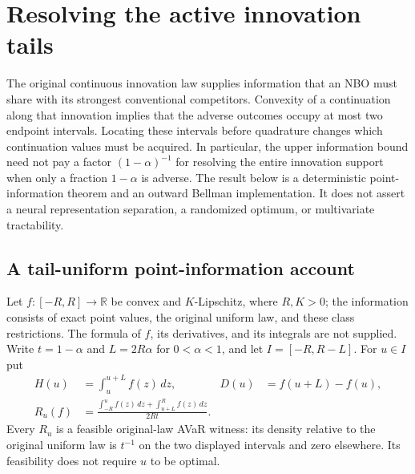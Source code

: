 \section{Resolving the active innovation tails}\label{sec:activetail119}
The original continuous innovation law supplies information that an NBO
must share with its strongest conventional competitors.  Convexity of a
continuation along that innovation implies that the adverse outcomes occupy
at most two endpoint intervals.  Locating these intervals before quadrature
changes which continuation values must be acquired.  In particular, the
upper information bound need not pay a factor $(1-\alpha)^{-1}$ for resolving
the entire innovation support when only a fraction $1-\alpha$ is adverse.
The result below is a deterministic point-information theorem and an
outward Bellman implementation.  It does not assert a neural representation
separation, a randomized optimum, or multivariate tractability.

\subsection{A tail-uniform point-information account}
Let $f:[-R,R]\to\mathbb R$ be convex and $K$-Lipschitz, where $R,K>0$;
the information consists of exact point values, the original uniform law,
and these class restrictions.  The formula of $f$, its derivatives, and
its integrals are not supplied.  Write $t=1-\alpha$ and $L=2R\alpha$ for
$0<\alpha<1$, and let $I=[-R,R-L]$.  For $u\in I$ put
\begin{align}
 H(u)&=\int_u^{u+L} f(z)\,dz,&
 D(u)&=f(u+L)-f(u),\label{eq:tailcenter119}\\
 R_u(f)&=\frac{\int_{-R}^{u}f(z)\,dz+
                         \int_{u+L}^{R}f(z)\,dz}{2Rt}.
 \label{eq:tailwitness119}
\end{align}
Every $R_u$ is a feasible original-law AVaR witness: its density relative
to the original uniform law is $t^{-1}$ on the two displayed intervals
and zero elsewhere.  Its feasibility does not require $u$ to be optimal.

